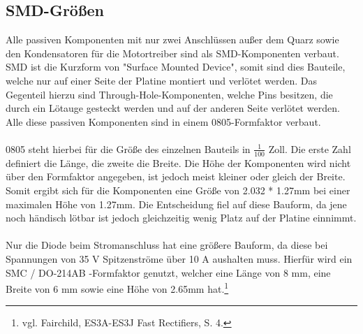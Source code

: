 \documentclass[12pt]{article}
\begin{document}
\subsection{SMD-Größen}
Alle passiven Komponenten mit nur zwei Anschlüssen außer dem Quarz sowie den Kondensatoren für die Motortreiber sind als SMD-Komponenten verbaut. SMD ist die Kurzform von "Surface Mounted Device", somit sind dies Bauteile, welche nur auf einer Seite der Platine montiert und verlötet werden. Das Gegenteil hierzu sind Through-Hole-Komponenten, welche Pins besitzen, die durch ein Lötauge gesteckt werden und auf der anderen Seite verlötet werden. Alle diese passiven Komponenten sind in einem 0805-Formfaktor verbaut.\\\\
0805 steht hierbei für die Größe des einzelnen Bauteils in $\frac{1}{100}$ Zoll. Die erste Zahl definiert die Länge, die zweite die Breite. Die Höhe der Komponenten wird nicht über den Formfaktor angegeben, ist jedoch meist kleiner oder gleich der Breite. Somit ergibt sich für die Komponenten eine Größe von 2.032 * 1.27mm bei einer maximalen Höhe von 1.27mm. Die Entscheidung fiel auf diese Bauform, da jene noch händisch lötbar ist jedoch gleichzeitig wenig Platz auf der Platine einnimmt. 
\\\\Nur die Diode beim Stromanschluss hat eine größere Bauform, da diese bei Spannungen von 35 V Spitzenströme über 10 A aushalten muss. Hierfür wird ein SMC / DO-214AB -Formfaktor genutzt, welcher eine Länge von 8 mm, eine Breite von 6 mm sowie eine Höhe von 2.65mm hat.\footnote{\selectfont vgl. Fairchild, ES3A-ES3J Fast Rectifiers, S. 4.}
\end{document}

